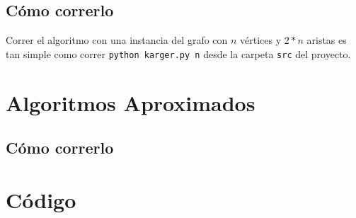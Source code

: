 \documentclass[a4paper,10pt]{article}
\begin{document}
\subsection{Cómo correrlo}
Correr el algoritmo con una instancia del grafo con $n$ vértices y $2*n$ aristas es tan simple como correr \texttt{python karger.py n} desde la carpeta \texttt{src} del proyecto.


\section{Algoritmos Aproximados}


\subsection{Cómo correrlo}


\pagebreak

\newpage
\section{Código}
\lstset{
	language=Python, columns=flexible, breaklines=true, frame=single, title=creador\_grafos.py
}


\lstset{ title=grafo.py }


\lstset{ title=karger.py }


\lstset{ title=parser.py }


\lstset{ title=pg.py }


\lstset{ title=pg_test.py }


\lstset{ title=subsetSum.py }


\lstset{ title=subsetSum_test.py }

\end{document}
